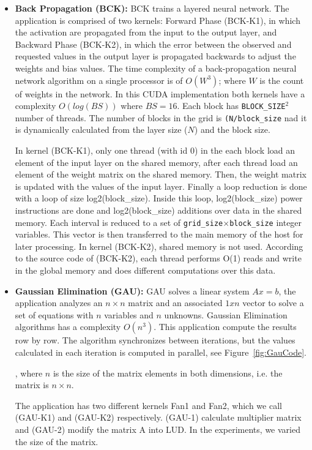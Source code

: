 \begin{itemize}
    \item {\bf Back Propagation (BCK):}
BCK trains a layered neural network. The application is comprised of two kernels: Forward Phase (BCK-K1), in which the activation are propagated from the input to the output layer, and Backward Phase (BCK-K2), in which the error between the observed and requested values in the output layer is propagated backwards to adjust the weights and bias values. The time complexity of a back-propagation neural network algorithm on a single processor is of $O(W^3)$; where $W$ is the count of weights in the network. In this CUDA implementation both kernels have a complexity $O(log(BS))$ where $BS=16$. Each block has \texttt{BLOCK\_SIZE}$^2$ number of threads. The number of blocks in the grid is \texttt{(N/block\_size} nad it is dynamically calculated from the layer size ($N$) and the block size.

In kernel (BCK-K1), only one thread (with id 0) in the each block load an element of the input layer on the shared memory, after each thread load an element of the weight matrix on the shared memory. Then, the weight matrix is updated with the values of the input layer. Finally a loop reduction is done with a loop of size log2(block\_size). Inside this loop, log2(block\_size) power instructions are done and log2(block\_size) additions over data in the shared memory. Each interval is reduced to a set of \texttt{grid\_size}$\times$\texttt{block\_size} integer variables. This vector is then transferred to the main memory of the host for later processing. In kernel (BCK-K2), shared memory is not used. According to the source code of (BCK-K2), each thread performs O(1) reads and write in the global memory and does different computations over this data.

\item{\bf Gaussian Elimination (GAU):}
GAU solves a linear system $Ax = b$, the application analyzes an $n\times{}n$ matrix and an associated $1 x n$ vector to solve a 
set of equations with $n$ variables and $n$ unknowns. Gaussian Elimination algorithms has a complexity $O(n^3)$. This application compute the results row by row. The algorithm synchronizes between iterations, but the values calculated in each iteration is computed in parallel, see Figure~\ref{fig:GauCode}.

, where $n$ is the size of the matrix elements in both dimensions, i.e. the matrix is $n\times{}n$. 


The application has two different kernels Fan1 and Fan2, which we call (GAU-K1) and (GAU-K2) respectively. (GAU-1) calculate multiplier matrix and (GAU-2) modify the matrix A into LUD. In the experiments, we varied the size of the matrix. 


\end{itemize}

